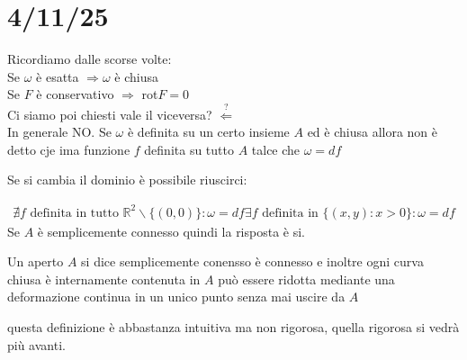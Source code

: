 \documentclass[a4paper, oneside]{article}
\begin{document}
\newpage
\section{4/11/25}
Ricordiamo dalle scorse volte:\\
Se $\omega$ è esatta $\Rightarrow \omega$ è chiusa\\
Se $F$ è conservativo $\Rightarrow$ rot$F=0$  \\
Ci siamo poi chiesti vale il viceversa? $\overset{?}{\Leftarrow}$\\
In generale NO. Se $\omega$ è definita su un certo insieme $A$ ed è chiusa allora non è detto cje ima funzione $f$ definita su tutto $A$ talce che $\omega = df$\\
\begin{example}
    Se si cambia il dominio è possibile riuscirci:
    \begin{center}
    \end{center}
    \begin{gather*}
        \nexists f \text{ definita in tutto } \mathbb{R}^2\backslash\{ (0,0) \}: \omega = df
        \exists f \text{ definita in } \{ (x,y): x>0 \}: \omega = df
    \end{gather*}
    Se $A$ è semplicemente connesso quindi la risposta è si.
\end{example}
\begin{definition}
    Un aperto $A$ si dice semplicemente conensso  è connesso e inoltre ogni curva chiusa è internamente contenuta in $A$ può essere ridotta mediante una deformazione continua in un unico punto senza mai uscire da $A$
\end{definition}
\tiny questa definizione è abbastanza intuitiva ma non rigorosa, quella rigorosa si vedrà più avanti.\normalsize\\
\end{document}
